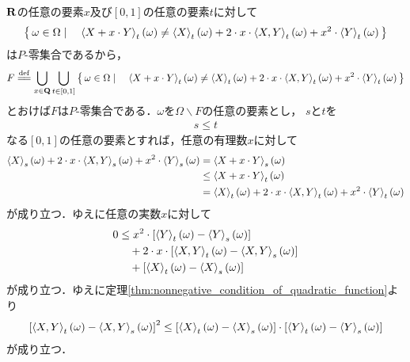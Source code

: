 	\begin{sketch}
		$\mathbf{R}$の任意の要素$x$及び$[0,1]$の任意の要素$t$に対して
		\begin{align}
			\Set{\omega \in \Omega}{\inprod<X+x \cdot Y>_{t}(\omega) \neq
			\inprod<X>_{t}(\omega) + 2 \cdot x \cdot \inprod<X,Y>_{t}(\omega)
			+ x^{2} \cdot \inprod<Y>_{t}(\omega)}
		\end{align}
		は$P$-零集合であるから，
		\begin{align}
			F \defeq \bigcup_{x \in \Q} \bigcup_{t \in [0,1]}
			\Set{\omega \in \Omega}{\inprod<X+x \cdot Y>_{t}(\omega) \neq
			\inprod<X>_{t}(\omega) + 2 \cdot x \cdot \inprod<X,Y>_{t}(\omega)
			+ x^{2} \cdot \inprod<Y>_{t}(\omega)}
		\end{align}
		とおけば$F$は$P$-零集合である．$\omega$を$\Omega \backslash F$の任意の要素とし，
		$s$と$t$を
		\begin{align}
			s \leq t
		\end{align}
		なる$[0,1]$の任意の要素とすれば，任意の有理数$x$に対して
		\begin{align}
			\inprod<X>_{s}(\omega) + 2 \cdot x \cdot \inprod<X,Y>_{s}(\omega)
			+ x^{2} \cdot \inprod<Y>_{s}(\omega)
			&= \inprod<X+x \cdot Y>_{s}(\omega) \\
			&\leq \inprod<X+x \cdot Y>_{t}(\omega) \\
			&= \inprod<X>_{t}(\omega) + 2 \cdot x \cdot \inprod<X,Y>_{t}(\omega)
			+ x^{2} \cdot \inprod<Y>_{t}(\omega)
		\end{align}
		が成り立つ．ゆえに任意の実数$x$に対して
		\begin{align}
			0 &\leq x^{2} \cdot \left[\inprod<Y>_{t}(\omega) - \inprod<Y>_{s}(\omega) \right] \\
			&\quad + 2 \cdot x \cdot \left[\inprod<X,Y>_{t}(\omega) - \inprod<X,Y>_{s}(\omega) \right] \\
			&\quad + \left[\inprod<X>_{t}(\omega) - \inprod<X>_{s}(\omega) \right]
		\end{align}
		が成り立つ．ゆえに定理\ref{thm:nonnegative_condition_of_quadratic_function}より
		\begin{align}
			\left[\inprod<X,Y>_{t}(\omega) - \inprod<X,Y>_{s}(\omega)\right]^{2}
			\leq \left[\inprod<X>_{t}(\omega) - \inprod<X>_{s}(\omega)\right] \cdot
			\left[\inprod<Y>_{t}(\omega) - \inprod<Y>_{s}(\omega)\right]
		\end{align}
		が成り立つ．
		\QED
	\end{sketch}
	